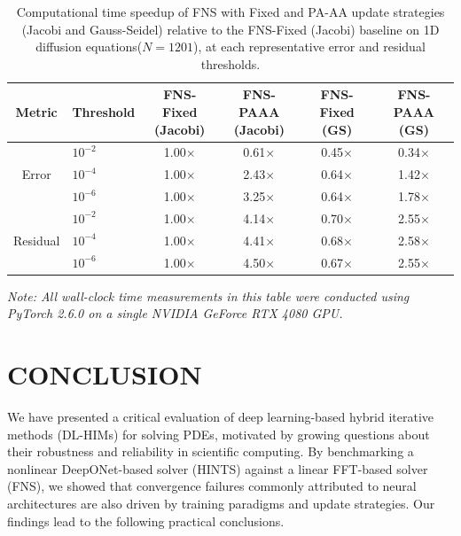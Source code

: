 \documentclass[11pt]{article}
\begin{document}
\begin{table}
\centering
\caption{Computational time speedup of FNS with Fixed and PA-AA update strategies (Jacobi and Gauss-Seidel) relative to the FNS-Fixed (Jacobi) baseline on 1D diffusion equations($N=1201$), at each representative error and residual thresholds.}
\label{tab:speedup}
\small
\begin{tabular}{clcccc}
\toprule
\textbf{Metric} & \textbf{Threshold} & \thead{FNS-Fixed\\(Jacobi)} & \thead{FNS-PAAA\\(Jacobi)} & \thead{FNS-Fixed\\(GS)} & \thead{FNS-PAAA\\(GS)} \\
\midrule
\multirow{3}{*}{Error}
    & $10^{-2}$ & 1.00$\times$ & 0.61$\times$ & 0.45$\times$ & 0.34$\times$ \\
    & $10^{-4}$ & 1.00$\times$ & 2.43$\times$ & 0.64$\times$ & 1.42$\times$ \\
    & $10^{-6}$ & 1.00$\times$ & 3.25$\times$ & 0.64$\times$ & 1.78$\times$ \\
\midrule
\multirow{3}{*}{Residual}
    & $10^{-2}$ & 1.00$\times$ & 4.14$\times$ & 0.70$\times$ & 2.55$\times$ \\
    & $10^{-4}$ & 1.00$\times$ & 4.41$\times$ & 0.68$\times$ & 2.58$\times$ \\
    & $10^{-6}$ & 1.00$\times$ & 4.50$\times$ & 0.67$\times$ & 2.55$\times$ \\
\bottomrule
\end{tabular}

\vspace{4pt}
\parbox{0.90\textwidth}{\footnotesize\textit{Note: All wall-clock time measurements in this table were conducted using PyTorch 2.6.0 on a single NVIDIA GeForce RTX 4080 GPU.} }

\end{table}


\section{CONCLUSION}
We have presented a critical evaluation of deep learning-based hybrid iterative methods (DL-HIMs) for solving PDEs, motivated by growing questions about their robustness and reliability in scientific computing. By benchmarking a nonlinear DeepONet-based solver (HINTS) against a linear FFT-based solver (FNS), we showed that convergence failures commonly attributed to neural architectures are also driven by training paradigms and update strategies. Our findings lead to the following practical conclusions.
\end{document}
